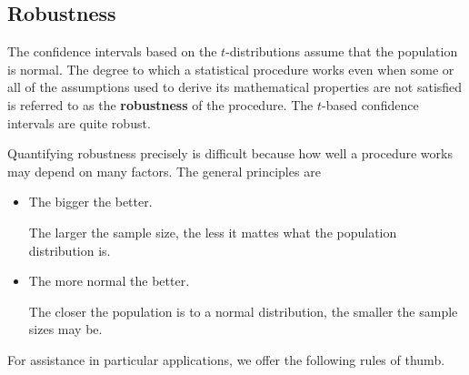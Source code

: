 \documentclass[twoside]{book}\usepackage[]{graphicx}\usepackage[]{xcolor}
\def\myindex#1{\index{#1}}
\def\term#1{\textbf{#1}}
\begin{document}
\subsection{Robustness}
\myindex{robustness}%
The confidence intervals based on the $t$-distributions assume that the population
is normal.  The degree to which a statistical procedure works even when some or all
of the assumptions used to derive its mathematical properties are not satisfied
is referred to as the \term{robustness} of the procedure.  The $t$-based confidence
intervals are quite robust.

Quantifying robustness precisely is difficult because how well a procedure works
may depend on many factors.  The general principles are
\begin{itemize}
	\item The bigger the better. 

		The larger the sample size, the less it mattes what the population
		distribution is.
	\item
		The more normal the better.  

		The closer the population is to a normal distribution,
		the smaller the sample sizes may be.
\end{itemize}

For assistance in particular applications, we offer the following rules of thumb.
\end{document}
